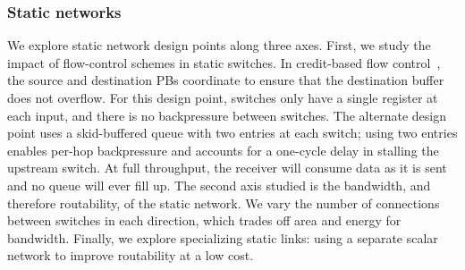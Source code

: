 \subsubsection{Static networks}
We explore static network design points along three axes. 
First, we study the impact of flow-control schemes in static switches. 
In credit-based flow control~\cite{wang2013avoiding}, the source and destination PBs coordinate to ensure that the destination buffer does not overflow.
For this design point, switches only have a single register at each input, and there is no backpressure between switches.
%
The alternate design point uses a skid-buffered queue with two entries at each switch; using two entries enables per-hop backpressure and accounts for a one-cycle delay in stalling the upstream switch.
At full throughput, the receiver will consume data as it is sent and no queue will ever fill up.
%
The second axis studied is the bandwidth, and therefore routability, of the static network. 
We vary the number of connections between switches in each direction, which trades off area and energy for bandwidth.
Finally, we explore specializing static links: using a separate scalar network to improve routability at a low cost.

